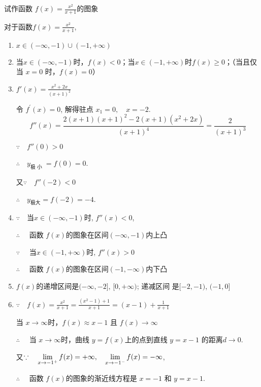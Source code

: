 \begin{example}
    试作函数 $f(x)=\frac{x^{2}}{x+1}$的图象
\end{example}

\begin{solution}
    对于函数$f(x)=\frac{x^2}{x+1}$,
\begin{enumerate}[(1)]
    \item $x\in ( - \infty , - 1) \cup ( - 1, + \infty )$ 
    \item 当$x\in(-\infty,-1)$时，$f(x)<0$；当$x\in(-1,+\infty)$时$f(x)\geqslant0$；（当且仅当 $x=0$ 时，$f(x)=0$）
    \item $f'(x)=\frac{x^2+2x}{(x+1)^2}$

令 $f^\prime\left(x\right)=0$, 解得驻点 $x_1=0,\quad x=-2$.
$$f''(x)=\frac{2(x+1)(x+1)^2-2(x+1)(x^2+2x)}{(x+1)^4}=\frac{2}{(x+1)^{3}}$$

$\because\quad f''( 0) > 0$

$\therefore\quad y_{\text{极 小 }}= f( 0) = 0$.

又$\because\quad f'' (-2)<0$

$\therefore\quad  y_{\text{极大}}=f(-2)=-4$.

\item $\because\quad$当$x\in ( - \infty , - 1)$时, $f''( x) < 0$,

$\therefore\quad $ 函数 $f(x)$的图象在区间$(-\infty,-1)$内上凸

$\because\quad $ 当$x\in(-1,+\infty)$时, $f''(x)>0$

$\therefore\quad$ 函数 $f(x)$的图象在区间$(-1,-\infty)$内下凸

\item $f(x)$的递增区间是$(-\infty,-2]$, $[0,+\infty)$; 递减区间
是$[-2,-1)$, $(-1,0]$

\item $\because\quad f( x) = \frac {x^{2}}{x+ 1}= \frac {( x^{2}- 1) + 1}{x+ 1}=(x-1)+\frac{1}{x+1}$

当 $x\to\infty$时，$f(x)\approx x-1$ 且 $f(x)\to\infty$

$\therefore\quad $ 当  $x\to \infty$时，曲线 $y=f(x)$上的点到直线 $y=x-1$
的距离$d\to0$.

又$\because\quad \lim\limits_{x\to - 1^{+}}f( x) = + \infty,\quad \lim\limits_{x\to - 1^{- }}f( x) = - \infty$,

$\therefore\quad $ 函数 $f(x)$的图象的渐近线方程是 $x=-1$ 和
$y=x-1$.


\end{enumerate}
\end{solution}

